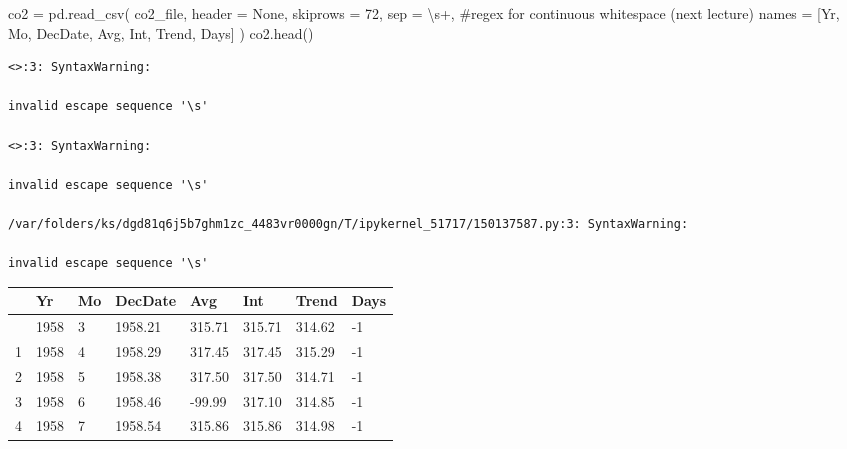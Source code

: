\documentclass[
  letterpaper,
  DIV=11,
  numbers=noendperiod]{scrreprt}
\newenvironment{Shaded}{\begin{snugshade}}{\end{snugshade}}
\newcommand{\CommentTok}[1]{\textcolor[rgb]{0.37,0.37,0.37}{#1}}
\newcommand{\DecValTok}[1]{\textcolor[rgb]{0.68,0.00,0.00}{#1}}
\newcommand{\NormalTok}[1]{\textcolor[rgb]{0.00,0.23,0.31}{#1}}
\newcommand{\OperatorTok}[1]{\textcolor[rgb]{0.37,0.37,0.37}{#1}}
\newcommand{\StringTok}[1]{\textcolor[rgb]{0.13,0.47,0.30}{#1}}
\newcommand{\VariableTok}[1]{\textcolor[rgb]{0.07,0.07,0.07}{#1}}
\begin{document}
\begin{Shaded}
\begin{Highlighting}[]
\NormalTok{co2 }\OperatorTok{=}\NormalTok{ pd.read\_csv(}
\NormalTok{    co2\_file, header }\OperatorTok{=} \VariableTok{None}\NormalTok{, skiprows }\OperatorTok{=} \DecValTok{72}\NormalTok{,}
\NormalTok{    sep }\OperatorTok{=} \StringTok{\textquotesingle{}\textbackslash{}s+\textquotesingle{}}\NormalTok{, }\CommentTok{\#regex for continuous whitespace (next lecture)}
\NormalTok{    names }\OperatorTok{=}\NormalTok{ [}\StringTok{\textquotesingle{}Yr\textquotesingle{}}\NormalTok{, }\StringTok{\textquotesingle{}Mo\textquotesingle{}}\NormalTok{, }\StringTok{\textquotesingle{}DecDate\textquotesingle{}}\NormalTok{, }\StringTok{\textquotesingle{}Avg\textquotesingle{}}\NormalTok{, }\StringTok{\textquotesingle{}Int\textquotesingle{}}\NormalTok{, }\StringTok{\textquotesingle{}Trend\textquotesingle{}}\NormalTok{, }\StringTok{\textquotesingle{}Days\textquotesingle{}}\NormalTok{]}
\NormalTok{)}
\NormalTok{co2.head()}
\end{Highlighting}
\end{Shaded}

\begin{verbatim}
<>:3: SyntaxWarning:

invalid escape sequence '\s'

<>:3: SyntaxWarning:

invalid escape sequence '\s'

/var/folders/ks/dgd81q6j5b7ghm1zc_4483vr0000gn/T/ipykernel_51717/150137587.py:3: SyntaxWarning:

invalid escape sequence '\s'
\end{verbatim}

\begin{longtable}[]{@{}llllllll@{}}
\toprule\noalign{}
& Yr & Mo & DecDate & Avg & Int & Trend & Days \\
\midrule\noalign{}
\endhead
\bottomrule\noalign{}
\endlastfoot
0 & 1958 & 3 & 1958.21 & 315.71 & 315.71 & 314.62 & -1 \\
1 & 1958 & 4 & 1958.29 & 317.45 & 317.45 & 315.29 & -1 \\
2 & 1958 & 5 & 1958.38 & 317.50 & 317.50 & 314.71 & -1 \\
3 & 1958 & 6 & 1958.46 & -99.99 & 317.10 & 314.85 & -1 \\
4 & 1958 & 7 & 1958.54 & 315.86 & 315.86 & 314.98 & -1 \\
\end{longtable}
\end{document}
